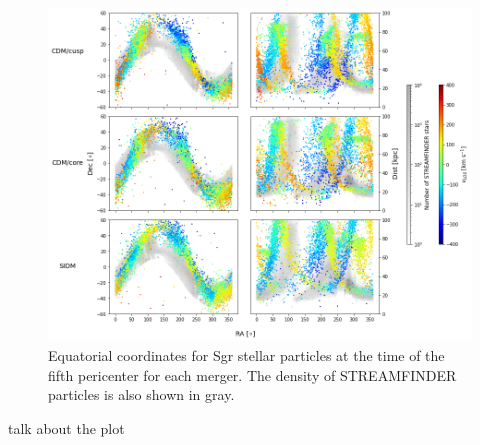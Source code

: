 \begin{figure}
    \centering 
    \includegraphics[width=1.0\linewidth]{figs/equatorial_streamfinder.png}
    \caption{%
        Equatorial coordinates for Sgr stellar particles at the time of the
        fifth pericenter for each merger. The density of STREAMFINDER particles
        is also shown in gray.
    }
    \label{fig:equatorial}
\end{figure}

talk about the plot


